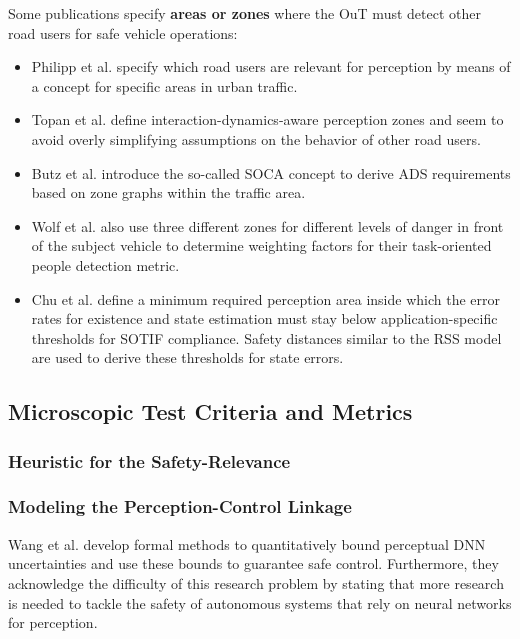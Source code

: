 \documentclass[conference]{IEEEtran}
\begin{document}
Some publications specify \textbf{areas or zones} where the OuT must detect other road users for safe vehicle operations: 
\begin{itemize}
\item Philipp et al. \cite{Philipp2022systematization} specify which road users are relevant for perception by means of a concept for specific areas in urban traffic.
\item Topan et al. \cite{Topan2022zones} define interaction-dynamics-aware perception zones and seem to avoid overly simplifying assumptions on the behavior of other road users.
\item Butz et al. \cite{Butz2020soca} introduce the so-called SOCA concept to derive ADS requirements based on zone graphs within the traffic area.
\item Wolf et al. \cite{Wolf2021people} also use three different zones for different levels of danger in front of the subject vehicle to determine weighting factors for their task-oriented people detection metric. 
\item Chu et al. \cite{Chu2023sotif} define a minimum required perception area inside which the error rates for existence and state estimation must stay below application-specific thresholds for SOTIF compliance. Safety distances similar to the RSS model are used to derive these thresholds for state errors.
\end{itemize}




\subsection{Microscopic Test Criteria and Metrics} 
\label{sec:safety_metrics_micro}

\subsubsection{Heuristic for the Safety-Relevance}
\label{sec:heuristic_safety_relevance}



\subsubsection{Modeling the Perception-Control Linkage}
\label{sec:metrics_perc_control_linkage}

Wang et al. \cite{Wang2021bounding} develop formal methods to quantitatively bound perceptual DNN uncertainties and use these bounds to guarantee safe control. 
Furthermore, they acknowledge the difficulty of this research problem by stating that more research is needed to tackle the safety of autonomous systems that rely on neural networks for perception. 
\end{document}

